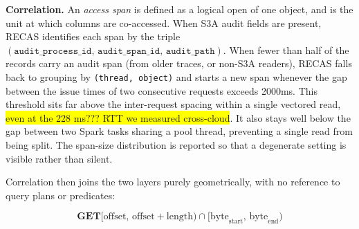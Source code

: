 \textbf{Correlation.} %
An \textit{access span} is defined as a logical open of one object, and %
is the unit at which columns are %
co-accessed. %
When S3A audit fields are present, RECAS identifies each span by the triple $(\texttt{audit\_process\_id},\,\texttt{audit\_span\_id},\,\texttt{audit\_path})$. 
When fewer than half of the records carry an audit span (from older traces, or non-S3A readers), RECAS falls back to grouping by \texttt{(thread, object)} %
and starts a new span whenever the gap between the issue times of two consecutive requests exceeds 2000ms. This threshold sits far above the inter-request spacing within a single vectored read, \colorbox{yellow}{even at the 228 ms??? RTT we measured cross-cloud}. It also stays well below the gap between two Spark tasks sharing a pool thread, preventing a single read from being split. The span-size distribution is reported so that a degenerate setting is visible rather than silent.

Correlation then joins the two layers purely geometrically, with no reference to query plans or predicates:

\[
\mathbf{GET}[\mathrm{offset},\,\mathrm{offset}+\mathrm{length})
\cap
[\mathrm{byte}_{\mathrm{start}},\,\mathrm{byte}_{\mathrm{end}})
\]


